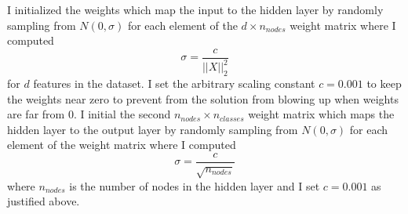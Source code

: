 \documentclass[12pt]{amsart}
\begin{document}
I initialized the weights which map the input to the hidden layer by randomly sampling from $N(0,\sigma)$ for each element of the $d \times n_{nodes}$ weight matrix where I computed 
\begin{equation}
\sigma = \frac{c}{||X||^2_2}
\end{equation}
for $d$ features in the dataset.  I set the arbitrary scaling constant $c = 0.001$ to keep the weights near zero to prevent from the solution from blowing up when weights are far from 0.  I initial the second $n_{nodes} \times n_{classes}$ weight matrix which maps the hidden layer to the output layer by randomly sampling from $N(0,\sigma)$ for each element of the weight matrix where I computed 
\begin{equation}
\sigma = \frac{c}{\sqrt{n_{nodes}}}
\end{equation}
where $n_{nodes}$ is the number of nodes in the hidden layer and I set $c = 0.001$ as justified above.
\end{document}
